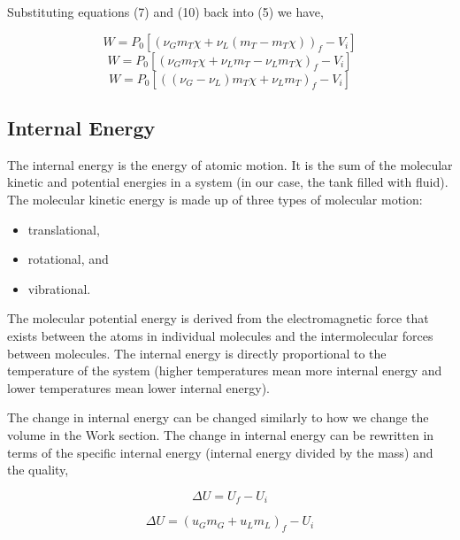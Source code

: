 \documentclass[10pt,parskip=half,
toc=sectionentrywithdots,
bibliography=totocnumbered,
captions=tableheading,numbers=noendperiod]{scrartcl}
\providecommand{\tightlist}{%
  \setlength{\itemsep}{0pt}\setlength{\parskip}{0pt}}
\begin{document}
Substituting equations (7) and (10) back into (5) we have,

\begin{equation}W = P_0\left[\left( \nu_G m_T \chi + \nu_L(m_T - m_T \chi) \right)_f - V_i\right]\end{equation}
\begin{equation}W = P_0\left[\left( \nu_G m_T \chi + \nu_L m_T - \nu_L m_T \chi \right)_f - V_i\right]\end{equation}
\begin{equation}W = P_0\left[\left( \left(\nu_G - \nu_L \right) m_T \chi + \nu_L m_T \right)_f - V_i\right]\end{equation}

\hypertarget{internal-energy}{%
\subsection{Internal Energy}\label{internal-energy}}

The internal energy is the energy of atomic motion. It is the sum of the
molecular kinetic and potential energies in a system (in our case, the
tank filled with fluid). The molecular kinetic energy is made up of
three types of molecular motion:

\begin{itemize}
\tightlist
\item
  translational,
\item
  rotational, and
\item
  vibrational.
\end{itemize}

The molecular potential energy is derived from the electromagnetic force
that exists between the atoms in individual molecules and the
intermolecular forces between molecules. The internal energy is directly
proportional to the temperature of the system (higher temperatures mean
more internal energy and lower temperatures mean lower internal energy).

The change in internal energy can be changed similarly to how we change
the volume in the Work section. The change in internal energy can be
rewritten in terms of the specific internal energy (internal energy
divided by the mass) and the quality,

\begin{equation}\Delta U = U_f - U_i\end{equation}

\begin{equation}\Delta U = \left(u_Gm_G + u_Lm_L\right)_f - U_i\end{equation}
\end{document}
